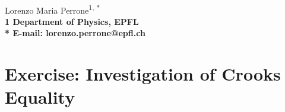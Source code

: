 \documentclass[11pt,letterpaper]{article}
\begin{document}
\vspace*{0.30in}

\begin{flushleft}
{\Large
\textbf{}
}
\newline
\\
Lorenzo Maria Perrone\textsuperscript{1, *}
\\
\bf{1} Department of Physics, EPFL
\\

% 
%





* E-mail: lorenzo.perrone@epfl.ch
\end{flushleft}


\section{Exercise: Investigation of Crooks Equality}
\end{document}
